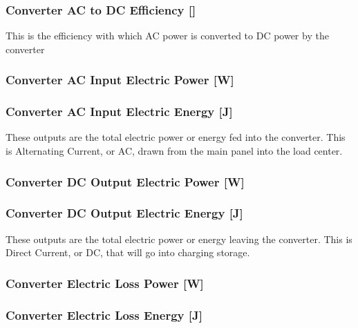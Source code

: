 \subsubsection{Converter AC to DC Efficiency {[]}}\label{converter-ac-to-dc-efficiency}

This is the efficiency with which AC power is converted to DC power by the converter

\subsubsection{Converter AC Input Electric Power {[}W{]}}\label{converter-ac-input-electric-power-w}

\subsubsection{Converter AC Input Electric Energy {[}J{]}}\label{converter-ac-input-electric-energy-j}

These outputs are the total electric power or energy fed into the converter. This is Alternating Current, or AC, drawn from the main panel into the load center.

\subsubsection{Converter DC Output Electric Power {[}W{]}}\label{converter-dc-output-electric-power-w}

\subsubsection{Converter DC Output Electric Energy {[}J{]}}\label{converter-dc-output-electric-energy-j}

These outputs are the total electric power or energy leaving the converter. This is Direct Current, or DC, that will go into charging storage.

\subsubsection{Converter Electric Loss Power {[}W{]}}\label{converter-electric-loss-power-w}

\subsubsection{Converter Electric Loss Energy {[}J{]}}\label{converter-electric-loss-energy-j}

